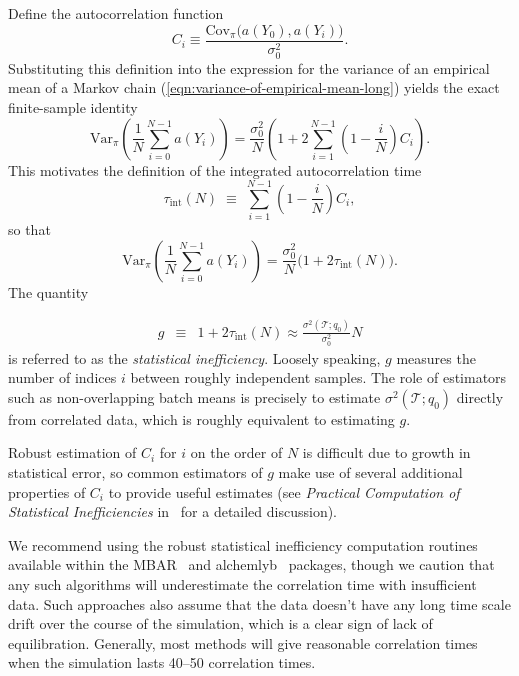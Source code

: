 Define the autocorrelation function 
\begin{equation}
C_i \equiv
\frac{\mathrm{Cov}_{\pi}\!\bigl(a(Y_0), a(Y_i)\bigr)}{\sigma_0^2}.
\label{equation:autocorrelation-definition}
\end{equation}
Substituting this definition into the expression for the variance of an empirical mean of a Markov chain (\ref{eqn:variance-of-empirical-mean-long}) yields the exact finite-sample identity
\begin{equation}
\mathrm{Var}_{\pi}\!\left(\frac{1}{N}\sum_{i=0}^{N-1} a(Y_i) \right)
=
\frac{\sigma_0^2}{N}
\left(
1 + 2\sum_{i=1}^{N-1}\left(1-\frac{i}{N}\right) C_i
\right).
\end{equation}
This motivates the definition of the integrated autocorrelation time
\begin{equation}
\tau_{\mathrm{int}}(N)
\;\equiv\;
\sum_{i=1}^{N-1}\left(1-\frac{i}{N}\right) C_i,
\label{eq:integrated-autocorrelation-time-definition}
\end{equation}
so that
\[
\mathrm{Var}_{\pi}\!\left(\frac{1}{N}\sum_{i=0}^{N-1} a(Y_i) \right)
= \frac{\sigma_0^2}{N}\bigl(1+2\tau_{\mathrm{int}}(N)\bigr).
\]
The quantity 

\begin{eqnarray}
g &\equiv& 1 + 2 \tau_{\mathrm{int}}(N) \approx  \frac{\sigma^2(\mathcal{T};q_0)}{\sigma_0^2} N \label{eq:statistical-inefficiency-definition} 
\end{eqnarray}
is referred to as the \textit{statistical inefficiency}. Loosely speaking, $g$ measures the number of indices $i$ between roughly independent samples. The role of estimators such as non-overlapping batch means is precisely to estimate $\sigma^2(\mathcal{T};q_0)$ directly from correlated data, which is roughly equivalent to estimating $g$. 

Robust estimation of $C_i$ for $i$ on the order of $N$ is difficult due to growth in statistical error, so common estimators of $g$ make use of several additional properties of $C_i$ to provide useful estimates (see \emph{Practical Computation of Statistical Inefficiencies} in~\cite{chodera2016simple} for a detailed discussion).

We recommend using the robust statistical inefficiency computation routines available within the MBAR~\cite{kylebeauchamp2019choderalab} and alchemlyb~\cite{daviddotson2019alchemistry} packages, though we caution that any such algorithms will underestimate the correlation time with insufficient data. Such approaches also assume that the data doesn't have any long time scale drift over the course of the simulation, which is a clear sign of lack of equilibration.  Generally, most methods will give reasonable correlation times when the simulation lasts 40--50 correlation times.

